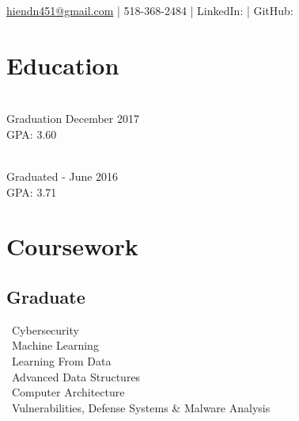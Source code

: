 \documentclass[]{deedy_format_Hien}
\begin{document}
%
%
\lastupdated

%
%


{\href{mailto:hiendn451@gmail.com}{hiendn451@gmail.com} | 518-368-2484 | 
LinkedIn:  \href{https://www.linkedin.com/in/hien-nguyen-5567149a}{} |
GitHub:   \href{https://github.com/nguyenduchien1994}{}
}

%
%

\begin{minipage}[t]{0.325\textwidth} 


\section{Education} 
\vspace{0.5mm} %
\\
Graduation December 2017 \\ GPA: 3.60
\sectionsep

\\		
Graduated - June 2016 \\ GPA: 3.71
\sectionsep

\sectionsep

    \vspace{-2.0mm}
\section{Coursework}
\vspace{0.5mm} %
\flushleft
\subsection{Graduate}
\textbullet \, Cybersecurity \\
\textbullet \, Machine Learning \\
\textbullet \, Learning From Data \\
\textbullet \, Advanced Data Structures \\
\textbullet \, Computer Architecture \\
\textbullet \, Vulnerabilities, Defense Systems \& Malware Analysis \\
\sectionsep


\end{minipage}
\end{document}
